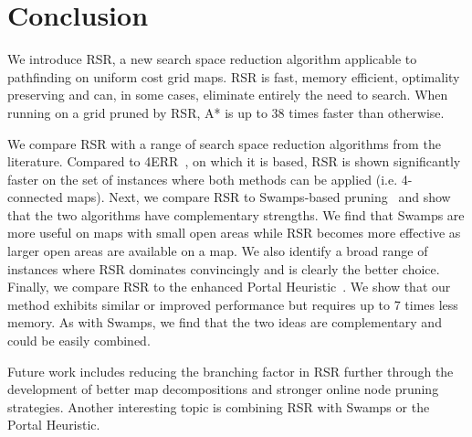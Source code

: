 \section{Conclusion}
We introduce RSR, a new search space reduction algorithm applicable to
pathfinding on uniform cost grid maps. RSR is fast, memory efficient,
optimality preserving and can, in some cases, eliminate entirely the need
to search.  
When running on a grid pruned by RSR, A* is up to 38 times faster than
otherwise.
\par
We compare RSR with a range of search space reduction algorithms from the
literature. Compared to 4ERR~\cite{harabor10}, on which it is based, RSR is
shown significantly faster on the set of instances where both methods can be
applied (i.e. 4-connected maps).  Next, we compare RSR to Swamps-based
pruning~\cite{pochter10} and show that the two algorithms have complementary
strengths.  We find that Swamps are more useful on maps with small open areas
while RSR becomes more effective as larger open areas are available on a map. We
also identify a broad range of instances where RSR dominates convincingly and is
clearly the better choice.  Finally, we compare RSR to the enhanced Portal
Heuristic~\cite{goldenberg10}.  We show that our method exhibits similar or
improved performance but requires up to 7 times less memory.  As with Swamps, we
find that the two ideas are complementary and could be easily combined.

\par
Future work includes reducing the branching factor in RSR further through the 
development of better map decompositions and stronger online node pruning
strategies.
Another interesting topic is combining RSR with Swamps or the Portal Heuristic.
